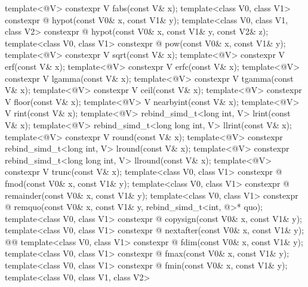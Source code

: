 \begin{codeblock}
{  template<@\mathfloatingpoint@ V> constexpr V fabs(const V& x);
  template<class V0, class V1>
    constexpr @ hypot(const V0& x, const V1& y);
  template<class V0, class V1, class V2>
    constexpr @ hypot(const V0& x, const V1& y, const V2& z);
  template<class V0, class V1>
    constexpr @ pow(const V0& x, const V1& y);
  template<@\mathfloatingpoint@ V> constexpr V sqrt(const V& x);
  template<@\mathfloatingpoint@ V> constexpr V erf(const V& x);
  template<@\mathfloatingpoint@ V> constexpr V erfc(const V& x);
  template<@\mathfloatingpoint@ V> constexpr V lgamma(const V& x);
  template<@\mathfloatingpoint@ V> constexpr V tgamma(const V& x);
  template<@\mathfloatingpoint@ V> constexpr V ceil(const V& x);
  template<@\mathfloatingpoint@ V> constexpr V floor(const V& x);
  template<@\mathfloatingpoint@ V> V nearbyint(const V& x);
  template<@\mathfloatingpoint@ V> V rint(const V& x);
  template<@\mathfloatingpoint@ V> rebind_simd_t<long int, V> lrint(const V& x);
  template<@\mathfloatingpoint@ V> rebind_simd_t<long long int, V> llrint(const V& x);
  template<@\mathfloatingpoint@ V> constexpr V round(const V& x);
  template<@\mathfloatingpoint@ V> constexpr rebind_simd_t<long int, V> lround(const V& x);
  template<@\mathfloatingpoint@ V> constexpr rebind_simd_t<long long int, V> llround(const V& x);
  template<@\mathfloatingpoint@ V> constexpr V trunc(const V& x);
  template<class V0, class V1>
    constexpr @ fmod(const V0& x, const V1& y);
  template<class V0, class V1>
    constexpr @ remainder(const V0& x, const V1& y);
  template<class V0, class V1>
    constexpr @ remquo(const V0& x, const V1& y,
                                           rebind_simd_t<int, @>* quo);
  template<class V0, class V1>
    constexpr @ copysign(const V0& x, const V1& y);
  template<class V0, class V1>
    constexpr @ nextafter(const V0& x, const V1& y);
    @\textrm{}@
  template<class V0, class V1>
    constexpr @ fdim(const V0& x, const V1& y);
  template<class V0, class V1>
    constexpr @ fmax(const V0& x, const V1& y);
  template<class V0, class V1>
    constexpr @ fmin(const V0& x, const V1& y);
  template<class V0, class V1, class V2>
}
\end{codeblock}
